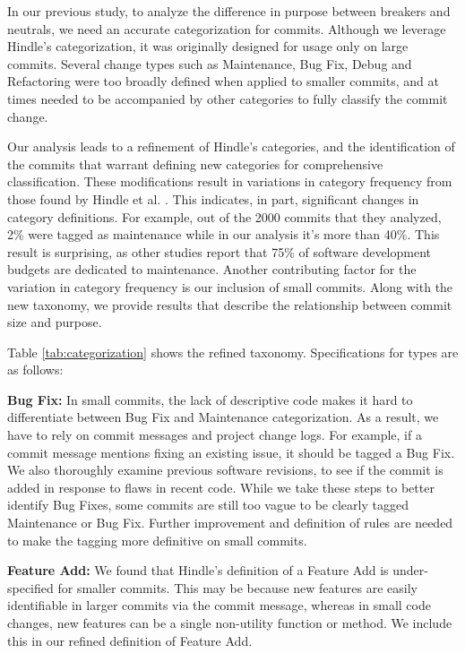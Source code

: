 In our previous study, to analyze the difference in purpose between breakers and neutrals, we need an accurate categorization for commits.
Although we leverage Hindle's categorization, it was originally designed for usage only on large commits.
Several change types such as Maintenance, Bug Fix, Debug and Refactoring were too broadly defined when applied to smaller commits, and at times needed to be accompanied by other categories to fully classify the commit change.

Our analysis leads to a refinement of Hindle's categories, and the identification of the commits that warrant defining new categories for comprehensive classification.
These modifications result in variations in category frequency from those found by Hindle et al. \cite{Hindle_cate}. This indicates, in part, significant changes in category definitions. For example, out of the 2000 commits that they analyzed, 2\% were tagged as maintenance while in our analysis it's more than 40\%.
This result is surprising, as other studies  \cite{dodaro2015government,redman2008weapon,koskinen2009software} report that 75\% of software development budgets are dedicated to maintenance. Another contributing factor for the variation in category frequency is our inclusion of small commits. Along with the new taxonomy, we provide results that describe the relationship between commit size and purpose.

Table \ref{tab:categorization} shows the refined taxonomy.
Specifications for types are as follows:

\textbf{Bug Fix:} In small commits, the lack of descriptive code makes it hard to differentiate between Bug Fix and Maintenance categorization. 
As a result, we have to rely on commit messages and project change logs. 
For example, if a commit message mentions fixing an existing issue, it should be tagged a Bug Fix. We also thoroughly examine previous software revisions, to see if the commit is added in response to flaws in recent code.
While we take these steps to better identify Bug Fixes, some commits are still too vague to be clearly tagged Maintenance or Bug Fix. 
Further improvement and definition of rules are needed to make the tagging more definitive on small commits.

\textbf{Feature Add:} We found that Hindle's definition of a Feature Add is under-specified for smaller commits.
This may be because new features are easily identifiable in larger commits via the commit message, whereas in small code changes, new features can be a single non-utility function or method. We include this in our refined definition of Feature Add.

